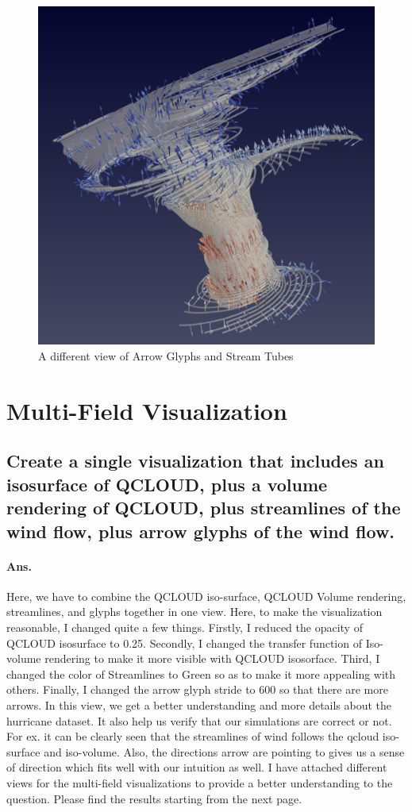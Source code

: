 \documentclass[a4paper,11pt]{article}
\theoremstyle{mytheor}
\begin{document}
\begin{figure}[!h]
    \centering
    \includegraphics[scale=0.6]{Figures/P2_4_3.PNG}
    \caption{A different view of Arrow Glyphs and Stream Tubes}
    \label{p2_6}
\end{figure}
\clearpage

\section{Multi-Field Visualization}
\subsection{Create a single visualization that includes an isosurface of QCLOUD, plus a volume rendering of QCLOUD, plus streamlines of the wind flow, plus arrow glyphs of the wind flow.}
\paragraph{Ans.} Here, we have to combine the QCLOUD iso-surface, QCLOUD Volume rendering, streamlines, and glyphs together in one view. Here, to make the visualization reasonable, I changed quite a few things. Firstly, I reduced the opacity of QCLOUD isosurface to 0.25. Secondly, I changed the transfer function of Iso-volume rendering to make it more visible with QCLOUD isosorface. Third, I changed the color of Streamlines to Green so as to make it more appealing with others. Finally, I changed the arrow glyph stride to 600 so that there are more arrows. In this view, we get a better understanding and more details about the hurricane dataset. It also help us verify that our simulations are correct or not. For ex. it can be clearly seen that the streamlines of wind follows the qcloud iso-surface and iso-volume. Also, the directions arrow are pointing to gives us a sense of direction which fits well with our intuition as well. I have attached different views for the multi-field visualizations to provide a better understanding to the question. Please find the results starting from the next page. 
\end{document}
